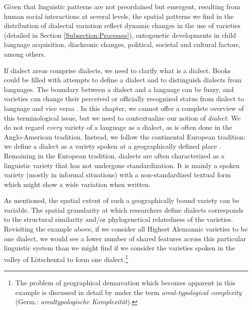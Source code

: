 \documentclass[output=paper]{langscibook}
\begin{document}
Given that linguistic patterns are not preordained but emergent, resulting from human social interactions at several levels, the spatial patterns we find in the distribution of dialectal variation reflect dynamic changes in the use of varieties (detailed in Section \ref{Subsection:Processes}), ontogenetic developments in child language acquisition, diachronic changes, political, societal and cultural factors, among others.

If dialect areas comprise dialects, we need to clarify what is a dialect. Books could be filled with attempts to define a dialect and to distinguish dialects from languages. The boundary between a dialect and a language can be fuzzy, and varieties can change their perceived or officially recognized status from dialect to language and vice versa \parencite[12]{Auer1996}. In this chapter, we cannot offer a complete overview of this terminological issue, but we need to contextualize our notion of \textit{dialect}. We do not regard \textit{every} variety of a language as a dialect, as is often done in the Anglo-American tradition. Instead, we follow the continental European tradition: we define a dialect as a variety spoken at a geographically defined place \parencite[230]{Berruto2010}. Remaining in the European tradition,  dialects are often characterized as a linguistic variety that has not undergone standardization. It is mainly a spoken variety (mostly in informal situations) with a non-standardized textual form which might show a wide variation when written.

As mentioned, the spatial extent of such a geographically bound variety can be variable. The spatial granularity at which researchers define dialects corresponds to the structural similarity and/or phylogenetical relatedness of the varieties. Revisiting the example above, if we consider all Highest Alemannic varieties to be one dialect, we would see a lower number of shared features across this particular linguistic system than we might find if we consider the varieties spoken in the valley of Lötschental to form one dialect.\footnote{The problem of geographical demarcation which becomes apparent in this example is discussed in detail by \textcite[1--8]{Lameli2013} under the term \textit{areal-typological complexity} (Germ.: \textit{arealtypologische Komplexität}).}
\end{document}
